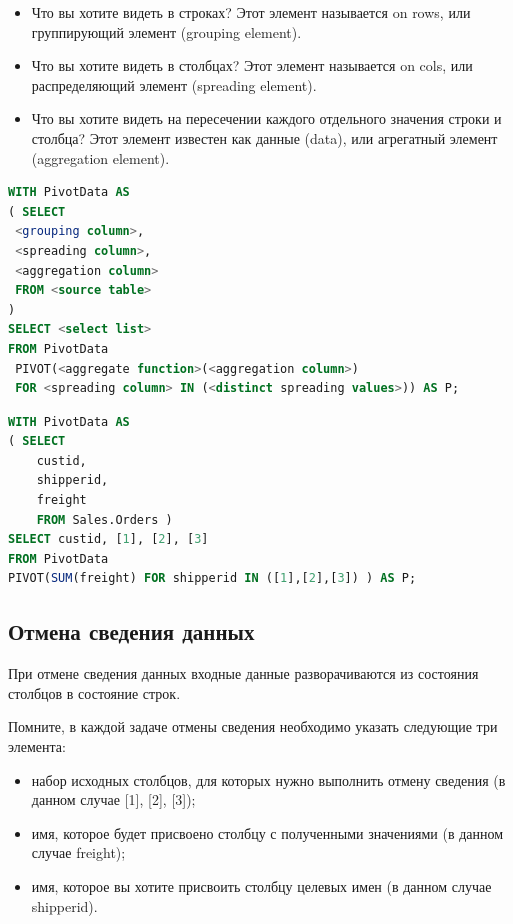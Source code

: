 \begin{itemize}
	\item Что вы хотите видеть в строках? Этот элемент называется on rows, или
	группирующий элемент (grouping element). 
	\item Что вы хотите видеть в столбцах? Этот элемент называется on cols, или распределяющий элемент (spreading element).
	\item Что вы хотите видеть на пересечении каждого отдельного значения строки и
	столбца? Этот элемент известен как данные (data), или агрегатный элемент
	(aggregation element). 
\end{itemize}


\begin{lstlisting}[label=lst:funcReturn, language=sql]
	WITH PivotData AS
( SELECT
 <grouping column>,
 <spreading column>,
 <aggregation column>
 FROM <source table>
)
SELECT <select list>
FROM PivotData
 PIVOT(<aggregate function>(<aggregation column>)
 FOR <spreading column> IN (<distinct spreading values>)) AS P; 
\end{lstlisting}	


\begin{lstlisting}[label=lst:funcReturn, caption=Вывод суммы заказа у каждого поставщика, language=sql]
WITH PivotData AS
( SELECT
	custid, 
	shipperid, 
	freight 
	FROM Sales.Orders )
SELECT custid, [1], [2], [3]
FROM PivotData
PIVOT(SUM(freight) FOR shipperid IN ([1],[2],[3]) ) AS P; 
\end{lstlisting}


\subsection{Отмена сведения данных}
При отмене
сведения данных входные данные разворачиваются из состояния столбцов в состояние строк.

Помните, в каждой задаче отмены сведения необходимо указать следующие три элемента: 

\begin{itemize}
	\item набор исходных столбцов, для которых нужно выполнить отмену сведения
	(в данном случае [1], [2], [3]); 
	\item имя, которое будет присвоено столбцу с полученными значениями (в данном
	случае freight); 
	\item имя, которое вы хотите присвоить столбцу целевых имен (в данном случае
	shipperid). 
\end{itemize}

